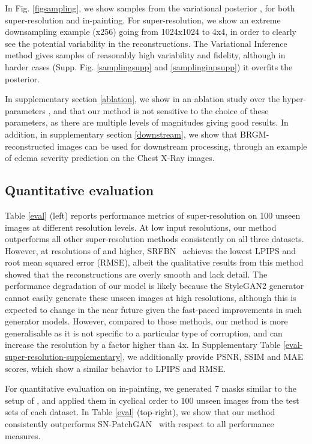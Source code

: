 \documentclass{article}
\newcommand{\srfbn}{SRFBN \cite{li2019feedback}}
\newcommand{\patchgan}{SN-PatchGAN \cite{yu2019free}}
\begin{document}
In Fig. \ref{figsampling}, we show samples from the variational posterior , for both super-resolution and in-painting. For super-resolution, we show an extreme downsampling example (x256) going from 1024x1024 to 4x4, in order to clearly see the potential variability in the reconstructions. The Variational Inference method gives samples of reasonably high variability and fidelity, although in harder cases (Supp. Fig. \ref{samplingsupp} and \ref{samplinginpsupp}) it overfits the posterior.

In supplementary section \ref{ablation}, we show in an ablation study over the hyper-parameters ,  and  that our method is not sensitive to the choice of these parameters, as there are multiple levels of magnitudes giving good results. In addition, in supplementary section \ref{downstream}, we show that BRGM-reconstructed images can be used for downstream processing, through an example of edema severity prediction on the Chest X-Ray images.


\subsection{Quantitative evaluation}

Table \ref{eval} (left) reports performance metrics of super-resolution on 100 unseen images at different resolution levels. At low  input resolutions, our method outperforms all other super-resolution methods consistently on all three datasets. However, at resolutions of  and higher, \srfbn\ achieves the lowest LPIPS\cite{zhang2018unreasonable} and root mean squared error (RMSE), albeit the qualitative results from this method showed that the reconstructions are overly smooth and lack detail. The performance degradation of our model is likely because the StyleGAN2 generator  cannot easily generate these unseen images at high resolutions, although this is expected to change in the near future given the fast-paced improvements in such generator models. However, compared to those methods, our method is more generalisable as it is not specific to a particular type of corruption, and can increase the resolution by a factor higher than 4x. In Supplementary Table \ref{eval-super-resolution-supplementary}, we additionally provide PSNR, SSIM and MAE scores, which show a similar behavior to LPIPS and RMSE.

For quantitative evaluation on in-painting, we generated 7 masks similar to the setup of \cite{abdal2020image2stylegan}, and applied them in cyclical order to 100 unseen images from the test sets of each dataset. In Table \ref{eval} (top-right), we show that our method consistently outperforms \patchgan\ with respect to all performance measures. 
\end{document}
